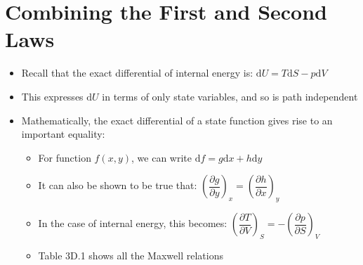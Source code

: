 \documentclass[12pt, openany, letterpaper]{memoir}
\begin{document}
\section{Combining the First and Second Laws}
\begin{itemize}
	\item Recall that the exact differential of internal energy is: $\mathrm{d}U = T\mathrm{d}S - p\mathrm{d}V$
	\item This expresses $\mathrm{d}U$ in terms of only state variables, and so is path independent
	\item Mathematically, the exact differential of a state function gives rise to an important equality:
	      \begin{itemize}
		      \item For function $f(x,y)$, we can write $\mathrm{d}f = g\mathrm{d}x + h\mathrm{d}y$
		      \item It can also be shown to be true that: $\left(\dfrac{\partial g}{\partial y}\right)_x = \left(\dfrac{\partial h}{\partial x}\right)_y$
		      \item In the case of internal energy, this becomes: $\left(\dfrac{\partial T}{\partial V}\right)_S = -\left(\dfrac{\partial p}{\partial S}\right)_V$
		      \item Table 3D.1 shows all the Maxwell relations
	      \end{itemize}
\end{itemize}
\end{document}
